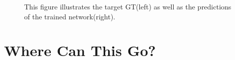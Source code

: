 \documentclass[
    ,title     = {{Image Segmentation for Smart Agriculture}}
    ,subject   = {{This is the subject of my work}}
    ,papersize = {{a1paper}}
    ,nocrop
]{dtuposter}
\begin{document}
\begin{dtupostercontent}
\begin{figure}
	\centering
{}
\caption{This figure illustrates the target GT(left) as well as the predictions of the trained network(right).}\label{fig:example}
\end{figure}



\section{Where Can This Go?}


\end{dtupostercontent}
\end{document}
